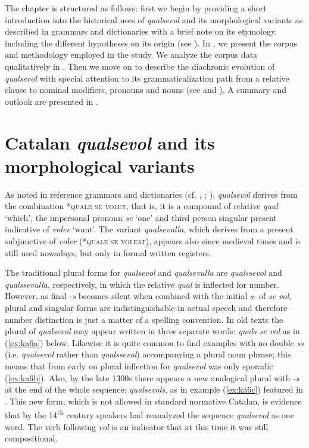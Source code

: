 \documentclass[output=paper,colorlinks,citecolor=brown]{langscibook}
\begin{document}
The chapter is structured as follows: first we begin by providing a short introduction into the historical uses of \textit{qualsevol} and its morphological variants as described in grammars and dictionaries with a brief note on its etymology, including the different hypotheses on its origin (see ). In , we present the corpus and methodology employed in the study. We analyze the corpus data qualitatively in . Then we move on to describe the diachronic evolution of \textit{qualsevol} with special attention to its grammaticalization path from a relative clause to nominal modifiers, pronouns and nouns (see  and ). A summary and outlook are presented in .

\section{Catalan \textit{qualsevol} and its morphological variants}\label{sec:kea2}

As noted in reference grammars and dictionaries (cf. \cite{Alcovermoll1962}, \cite[][VI: 889]{Coromines1985}; \cite[][184]{Moll2006}), \textit{qualsevol} derives from the combination *\textsc{quale se volet}, that is, it is a compound of relative \textit{qual} ‘which’, the impersonal pronoun \textit{se} ‘one’ and third person singular present indicative of \textit{voler} ‘want’. The variant \textit{qualsevulla}, which derives from a present subjunctive of \textit{voler} (*\textsc{quale se voleat}), appears also since medieval times and is still used nowadays, but only in formal written registers.

The traditional plural forms for \textit{qualsevol} and \textit{qualsevulla} are \textit{qualssevol} and \textit{qualssevulla}, respectively, in which the relative \textit{qual} is inflected for number. However, as final -\textit{s} becomes silent when combined with the initial \textit{s}- of \textit{se vol}, plural and singular forms are indistinguishable in actual speech and therefore number distinction is just a matter of a spelling convention. In old texts the plural of \textit{qualsevol} may appear written in three separate words: \textit{quals se vol} as in (\ref{ex:ka6a}) below. Likewise it is quite common to find examples with no double \textit{ss} (i.e. \textit{qualsevol} rather than \textit{qualssevol}) accompanying a plural noun phrase; this means that from early on plural inflection for \textit{qualsevol} was only sporadic (\ref{ex:ka6b}). Also, by the late 1300s there appears a new analogical plural with -\textit{s} at the end of the whole sequence: \textit{qualsevols}, as in example (\ref{ex:ka6c}) featured in \citet{Alcovermoll1962}. This new form, which is not allowed in standard normative Catalan, is evidence that by the 14\textsuperscript{th} century speakers had reanalyzed the sequence \textit{qualsevol} as one word. The verb following \textit{vol} is an indicator that at this time it was still compositional.
\end{document}

